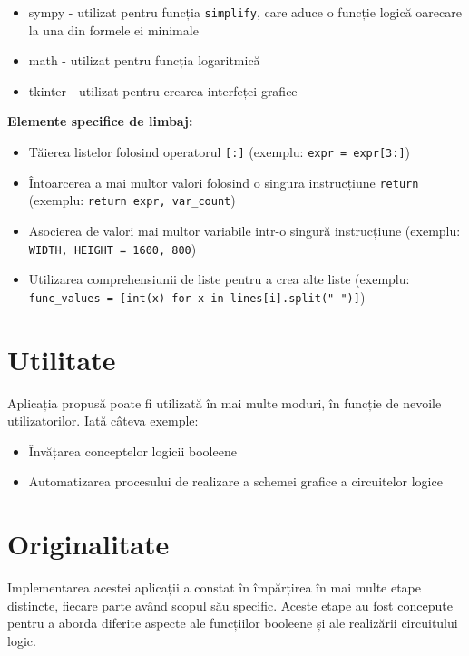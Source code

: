 \documentclass{article}
\begin{document}
\begin{itemize}
  \item sympy - utilizat pentru funcția \verb|simplify|, care aduce o funcție logică oarecare la una din formele ei minimale
  \item math - utilizat pentru funcția logaritmică
  \item tkinter - utilizat pentru crearea interfeței grafice
\end{itemize}

\textbf{Elemente specifice de limbaj:}

\begin{itemize}
  \item Tăierea listelor folosind operatorul \verb|[:]| (exemplu: \verb|expr = expr[3:]|)
  \item Întoarcerea a mai multor valori folosind o singura instrucțiune \verb|return| (exemplu: \verb|return expr, var_count|)
  \item Asocierea de valori mai multor variabile intr-o singură instrucțiune (exemplu: \verb|WIDTH, HEIGHT = 1600, 800|)
  \item Utilizarea comprehensiunii de liste pentru a crea alte liste (exemplu:\\ \verb|func_values = [int(x) for x in lines[i].split(" ")]|)
\end{itemize}

\section*{Utilitate}
\hspace{0.5cm}Aplicația propusă poate fi utilizată în mai multe moduri, în funcție de nevoile utilizatorilor. Iată câteva exemple:

\begin{itemize}
  \item Învățarea conceptelor logicii booleene
  \item Automatizarea procesului de realizare a schemei grafice a circuitelor logice
\end{itemize}

\section*{Originalitate}
\hspace{1cm}Implementarea acestei aplicații a constat în împărțirea în mai multe etape distincte, fiecare parte având scopul său specific. Aceste etape au fost concepute pentru a aborda diferite aspecte ale funcțiilor booleene și ale realizării circuitului logic.
\end{document}
